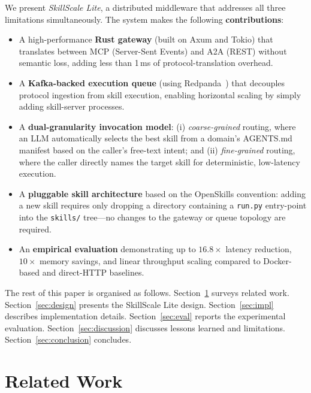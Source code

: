 \documentclass[sigconf,nonacm]{acmart}
\begin{document}
We present \emph{SkillScale Lite}, a distributed middleware that addresses all three limitations simultaneously. The system makes the following \textbf{contributions}:

\begin{itemize}
  \item A high-performance \textbf{Rust gateway} (built on Axum and Tokio) that translates between MCP (Server-Sent Events) and A2A (REST) without semantic loss, adding less than 1\,ms of protocol-translation overhead.
  \item A \textbf{Kafka-backed execution queue} (using Redpanda~\cite{redpanda2022}) that decouples protocol ingestion from skill execution, enabling horizontal scaling by simply adding skill-server processes.
  \item A \textbf{dual-granularity invocation model}: (i) \emph{coarse-grained} routing, where an LLM automatically selects the best skill from a domain's AGENTS.md manifest based on the caller's free-text intent; and (ii) \emph{fine-grained} routing, where the caller directly names the target skill for deterministic, low-latency execution.
  \item A \textbf{pluggable skill architecture} based on the OpenSkills convention: adding a new skill requires only dropping a directory containing a \texttt{run.py} entry-point into the \texttt{skills/} tree---no changes to the gateway or queue topology are required.
  \item An \textbf{empirical evaluation} demonstrating up to $16.8\times$ latency reduction, $10\times$ memory savings, and linear throughput scaling compared to Docker-based and direct-HTTP baselines.
\end{itemize}

The rest of this paper is organised as follows. Section~\ref{sec:related} surveys related work. Section~\ref{sec:design} presents the SkillScale Lite design. Section~\ref{sec:impl} describes implementation details. Section~\ref{sec:eval} reports the experimental evaluation. Section~\ref{sec:discussion} discusses lessons learned and limitations. Section~\ref{sec:conclusion} concludes.

\section{Related Work}
\label{sec:related}
\end{document}
